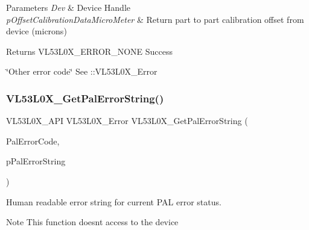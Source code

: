 \begin{DoxyParams}{Parameters}
{\em Dev} & Device Handle \\
\hline
{\em p\+Offset\+Calibration\+Data\+Micro\+Meter} & Return part to part calibration offset from device (microns) \\
\hline
\end{DoxyParams}
\begin{DoxyReturn}{Returns}
V\+L53\+L0\+X\+\_\+\+E\+R\+R\+O\+R\+\_\+\+N\+O\+NE Success 

\char`\"{}\+Other error code\char`\"{} See \+::\+V\+L53\+L0\+X\+\_\+\+Error 
\end{DoxyReturn}
\mbox{\label{group__VL53L0X__general__group_gaa647e7ed8b78178968fab9b3562ebac7}} 
\subsubsection{\texorpdfstring{V\+L53\+L0\+X\+\_\+\+Get\+Pal\+Error\+String()}{VL53L0X\_GetPalErrorString()}}
{\footnotesize\ttfamily V\+L53\+L0\+X\+\_\+\+A\+PI V\+L53\+L0\+X\+\_\+\+Error V\+L53\+L0\+X\+\_\+\+Get\+Pal\+Error\+String (\begin{DoxyParamCaption}\item[{V\+L53\+L0\+X\+\_\+\+Error}]{Pal\+Error\+Code,  }\item[{char $\ast$}]{p\+Pal\+Error\+String }\end{DoxyParamCaption})}



Human readable error string for current P\+AL error status. 

\begin{DoxyNote}{Note}
This function doesn\textquotesingle{}t access to the device
\end{DoxyNote}

